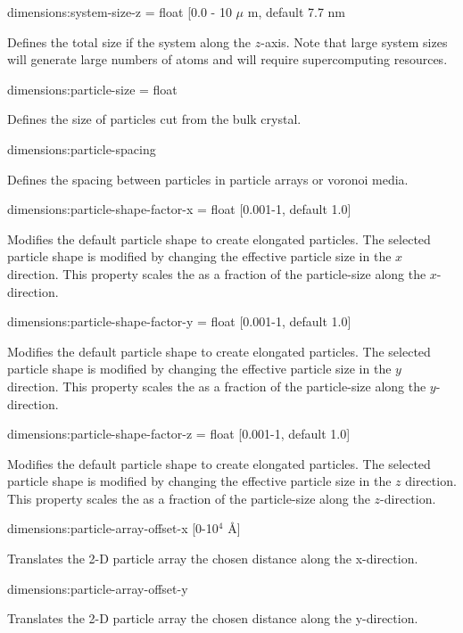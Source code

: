{\zicf dimensions:system-size-z = float [0.0 - 10 $\mu$ m, default 7.7 nm}
Defines the total size if the system along the $z$-axis. Note that
large system sizes will generate large numbers of atoms and will require
supercomputing resources.

{\zicf dimensions:particle-size = float} Defines the size of particles cut from the bulk crystal.

{\zicf dimensions:particle-spacing} Defines the spacing between particles in particle arrays or voronoi media.


{\zicf dimensions:particle-shape-factor-x = float [0.001-1, default 1.0]} 
Modifies the default particle shape to create elongated particles. The selected
particle shape is modified by changing the effective particle size in the $x$
direction. This property scales the as a fraction of the particle-size along the
$x$-direction.

{\zicf dimensions:particle-shape-factor-y = float [0.001-1, default 1.0]} 
Modifies the default particle shape to create elongated particles. The selected
particle shape is modified by changing the effective particle size in the $y$
direction. This property scales the as a fraction of the particle-size along the
$y$-direction.

{\zicf dimensions:particle-shape-factor-z = float [0.001-1, default 1.0]}
Modifies the default particle shape to create elongated particles. The selected
particle shape is modified by changing the effective particle size in the $z$
direction. This property scales the as a fraction of the particle-size along the
$z$-direction.

{\zicf dimensions:particle-array-offset-x [0-10$^4$ \AA]}
Translates the 2-D particle array the chosen distance along the x-direction.

{\zicf dimensions:particle-array-offset-y}
Translates the 2-D particle array the chosen distance along the y-direction.

